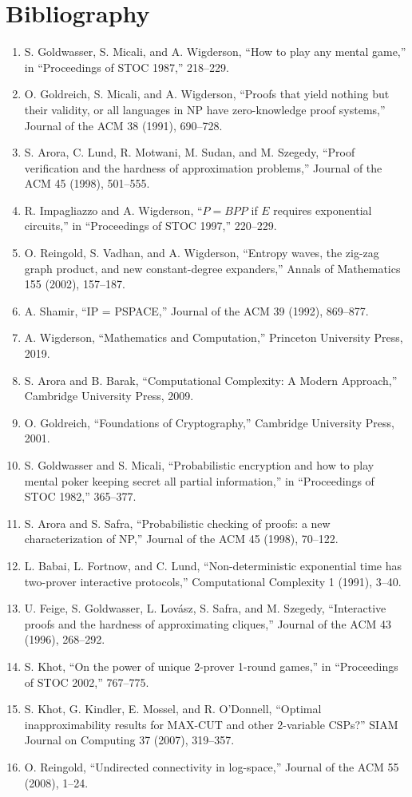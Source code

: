 \section*{Bibliography}
\begin{enumerate}
\item S. Goldwasser, S. Micali, and A. Wigderson, ``How to play any mental game,'' in ``Proceedings of STOC 1987,'' 218--229.
\item O. Goldreich, S. Micali, and A. Wigderson, ``Proofs that yield nothing but their validity, or all languages in NP have zero-knowledge proof systems,'' Journal of the ACM 38 (1991), 690--728.
\item S. Arora, C. Lund, R. Motwani, M. Sudan, and M. Szegedy, ``Proof verification and the hardness of approximation problems,'' Journal of the ACM 45 (1998), 501--555.
\item R. Impagliazzo and A. Wigderson, ``$P = BPP$ if $E$ requires exponential circuits,'' in ``Proceedings of STOC 1997,'' 220--229.
\item O. Reingold, S. Vadhan, and A. Wigderson, ``Entropy waves, the zig-zag graph product, and new constant-degree expanders,'' Annals of Mathematics 155 (2002), 157--187.
\item A. Shamir, ``IP = PSPACE,'' Journal of the ACM 39 (1992), 869--877.
\item A. Wigderson, ``Mathematics and Computation,'' Princeton University Press, 2019.
\item S. Arora and B. Barak, ``Computational Complexity: A Modern Approach,'' Cambridge University Press, 2009.
\item O. Goldreich, ``Foundations of Cryptography,'' Cambridge University Press, 2001.
\item S. Goldwasser and S. Micali, ``Probabilistic encryption and how to play mental poker keeping secret all partial information,'' in ``Proceedings of STOC 1982,'' 365--377.
\item S. Arora and S. Safra, ``Probabilistic checking of proofs: a new characterization of NP,'' Journal of the ACM 45 (1998), 70--122.
\item L. Babai, L. Fortnow, and C. Lund, ``Non-deterministic exponential time has two-prover interactive protocols,'' Computational Complexity 1 (1991), 3--40.
\item U. Feige, S. Goldwasser, L. Lov\'asz, S. Safra, and M. Szegedy, ``Interactive proofs and the hardness of approximating cliques,'' Journal of the ACM 43 (1996), 268--292.
\item S. Khot, ``On the power of unique 2-prover 1-round games,'' in ``Proceedings of STOC 2002,'' 767--775.
\item S. Khot, G. Kindler, E. Mossel, and R. O'Donnell, ``Optimal inapproximability results for MAX-CUT and other 2-variable CSPs?'' SIAM Journal on Computing 37 (2007), 319--357.
\item O. Reingold, ``Undirected connectivity in log-space,'' Journal of the ACM 55 (2008), 1--24.
\end{enumerate}

